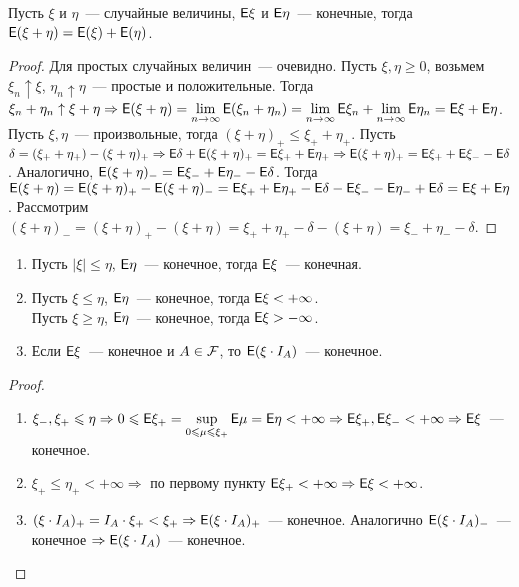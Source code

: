 \begin{property}[Аддитивность]
	Пусть $\xi$ и $\eta$~--- случайные величины, $\mathsf{E}\xi$ и $\mathsf{E}\eta$~--- конечные, тогда $\mathsf{E}(\xi + \eta) = \mathsf{E}(\xi) + \mathsf{E}(\eta)$.
	\begin{proof}
		Для простых случайных величин~--- очевидно. Пусть $\xi, \eta \geqslant 0$, возьмем $\xi_n \uparrow \xi$, $\eta_n \uparrow \eta$~--- простые и положительные. Тогда $\xi_n + \eta_n \uparrow \xi + \eta \Rightarrow \mathsf{E}(\xi + \eta) = \lim\limits_{n \rightarrow \infty}\mathsf{E}(\xi_n + \eta_n) = \lim\limits_{n \rightarrow \infty}\mathsf{E} \xi_n + \lim\limits_{n \rightarrow \infty} \mathsf{E}\eta_n = \mathsf{E}\xi + \mathsf{E}\eta$. Пусть $\xi, \eta$~--- произвольные, тогда $(\xi + \eta)_+ \leqslant \xi_+ + \eta_+$. Пусть $\delta = (\xi_+ + \eta_+) - (\xi + \eta)_+ \Rightarrow \mathsf{E}\delta + \mathsf{E}(\xi + \eta)_+ = \mathsf{E}\xi_+ + \mathsf{E}\eta_+ \Rightarrow \mathsf{E}(\xi + \eta)_+ = \mathsf{E}\xi_+ + \mathsf{E}\xi_- - \mathsf{E}\delta$. Аналогично, $\mathsf{E}(\xi + \eta)_- = \mathsf{E}\xi_- + \mathsf{E}\eta_- - \mathsf{E}\delta$. Тогда $\mathsf{E}(\xi + \eta) = \mathsf{E}(\xi + \eta)_+ - \mathsf{E}(\xi + \eta)_- = \mathsf{E}\xi_+ + \mathsf{E}\eta_+ - \mathsf{E}\delta - \mathsf{E}\xi_- - \mathsf{E}\eta_- + \mathsf{E} \delta = \mathsf{E}\xi + \mathsf{E}\eta$. Рассмотрим $(\xi + \eta)_- = (\xi + \eta)_+ - (\xi + \eta) = \xi_+ + \eta_+ - \delta - (\xi + \eta) = \xi_- + \eta_- - \delta$.
	\end{proof}
\end{property}
\begin{property}
	\begin{enumerate}
		\item Пусть $|\xi| \leqslant \eta$, $\mathsf{E}\eta$~--- конечное, тогда $\mathsf{E} \xi$~--- конечная.
		\item Пусть $\xi \leqslant \eta$, $\mathsf{E}\eta$~--- конечное, тогда $\mathsf{E}\xi < + \infty$. \\
		Пусть $\xi \geqslant \eta$, $\mathsf{E}\eta$~--- конечное, тогда $\mathsf{E}\xi > - \infty$.
		\item Если $\mathsf{E}\xi$~--- конечное и $A \in \mathcal{F}$, то $\mathsf{E}(\xi\cdot I_A)$~--- конечное.
	\end{enumerate}
	\begin{proof}
		\begin{enumerate}
			\item $\xi_-, \xi_+ \leqslant \eta \Rightarrow 0 \leqslant \mathsf{E}\xi_+ = \sup\limits_{0 \leqslant \mu \leqslant \xi_+}\mathsf{E}\mu = \mathsf{E}\eta < +\infty \Rightarrow \mathsf{E}\xi_+, \mathsf{E}\xi_- < +\infty \Rightarrow \mathsf{E}\xi$~--- конечное.
			\item $\xi_+ \leqslant \eta_+ < +\infty \Rightarrow$ по первому пункту $\mathsf{E}\xi_+ < +\infty \Rightarrow \mathsf{E}\xi < +\infty$.
			\item $(\xi\cdot I_A)_+ = I_A\cdot\xi_+ < \xi_+ \Rightarrow \mathsf{E}(\xi\cdot I_A)_+$~--- конечное. Аналогично $\mathsf{E}(\xi\cdot I_A)_-$~--- конечное $\Rightarrow \mathsf{E}(\xi\cdot I_A)$~--- конечное.
		\end{enumerate}
	\end{proof}
\end{property}
